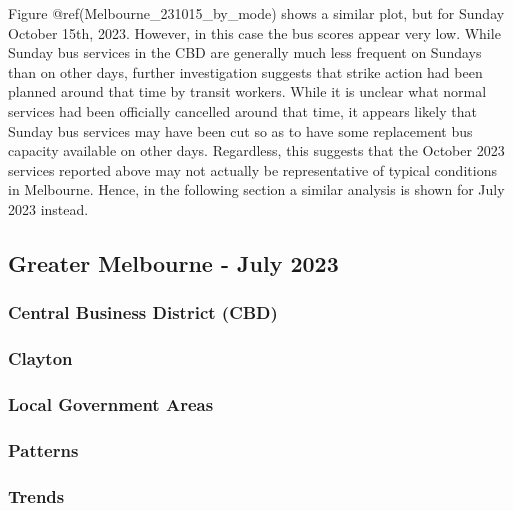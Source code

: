 \documentclass[preprint, 3p,
authoryear]{elsarticle} %
\begin{document}
Figure @ref(Melbourne\_231015\_by\_mode) shows a similar plot, but for
Sunday October 15th, 2023. However, in this case the bus scores appear
very low. While Sunday bus services in the CBD are generally much less
frequent on Sundays than on other days, further investigation suggests
that strike action had been planned around that time by transit
workers\citep{Hannaford_2023}. While it is unclear what normal services
had been officially cancelled around that time, it appears likely that
Sunday bus services may have been cut so as to have some replacement bus
capacity available on other days. Regardless, this suggests that the
October 2023 services reported above may not actually be representative
of typical conditions in Melbourne. Hence, in the following section a
similar analysis is shown for July 2023 instead.

\hypertarget{greater-melbourne---july-2023}{%
\subsection{Greater Melbourne - July
2023}\label{greater-melbourne---july-2023}}

\hypertarget{central-business-district-cbd}{%
\subsubsection{Central Business District
(CBD)}\label{central-business-district-cbd}}

\hypertarget{clayton}{%
\subsubsection{Clayton}\label{clayton}}

\hypertarget{local-government-areas}{%
\subsubsection{Local Government Areas}\label{local-government-areas}}

\hypertarget{patterns}{%
\subsubsection{Patterns}\label{patterns}}

\hypertarget{trends}{%
\subsubsection{Trends}\label{trends}}
\end{document}
